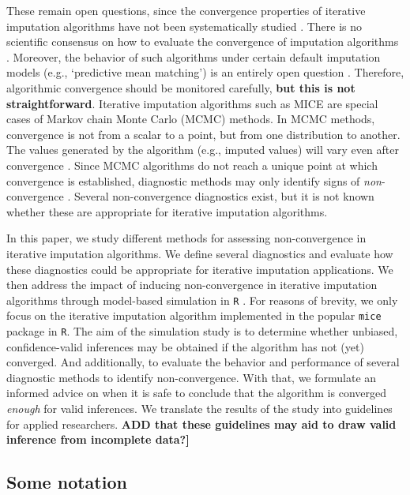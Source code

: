 \documentclass[Royal,times,sageh]{sagej}
\begin{document}
These remain open questions, since the convergence properties of iterative imputation algorithms have not been systematically studied \citep{zhu15, buur18}. There is no scientific consensus on how to evaluate the convergence of imputation algorithms \citep{taka17}. Moreover, the behavior of such algorithms under certain default imputation models (e.g., `predictive mean matching') is an entirely open question \citep{murr18}. Therefore, algorithmic convergence should be monitored carefully, \textbf{but this is not straightforward}. Iterative imputation algorithms such as MICE are special cases of Markov chain Monte Carlo (MCMC) methods. In MCMC methods, convergence is not from a scalar to a point, but from one distribution to another. The values generated by the algorithm (e.g., imputed values) will vary even after convergence \citep{gelm13}. Since MCMC algorithms do not reach a unique point at which convergence is established, diagnostic methods may only identify signs of \emph{non}-convergence \citep{hoff09}. Several non-convergence diagnostics exist, but it is not known whether these are appropriate for iterative imputation algorithms.

In this paper, we study different methods for assessing non-convergence in iterative imputation algorithms. We define several diagnostics and evaluate how these diagnostics could be appropriate for iterative imputation applications. We then address the impact of inducing non-convergence in iterative imputation algorithms through model-based simulation in \texttt{R} \citep{R}. For reasons of brevity, we only focus on the iterative imputation algorithm implemented in the popular \texttt{mice} package \citep{mice} in \texttt{R}. The aim of the simulation study is to determine whether unbiased, confidence-valid inferences may be obtained if the algorithm has not (yet) converged. And additionally, to evaluate the behavior and performance of several diagnostic methods to identify non-convergence. With that, we formulate an informed advice on when it is safe to conclude that the algorithm is converged \emph{enough} for valid inferences. We translate the results of the study into guidelines for applied researchers. \textbf{ADD that these guidelines may aid to draw valid inference from incomplete data?{]}}

\hypertarget{some-notation}{%
\subsection{Some notation}\label{some-notation}}
\end{document}
